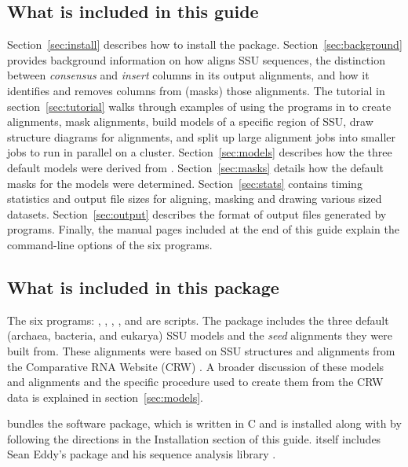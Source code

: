 \subsection{What is included in this guide}

Section~\ref{sec:install} describes how to install the
package. Section~\ref{sec:background} provides background information
on how  aligns SSU sequences, the distinction between
\emph{consensus} and \emph{insert} columns in its output alignments,
and how it identifies and removes columns from (masks) those
alignments.  The tutorial in section~\ref{sec:tutorial} walks through
examples of using the programs in  to create
alignments, mask alignments, build models of a specific region of SSU,
draw structure diagrams for alignments, and split up large alignment
jobs into smaller jobs to run in parallel on a cluster.
Section~\ref{sec:models} describes how the three default models were
derived from . Section~\ref{sec:masks} details how the
default masks for the models were determined. 
Section~\ref{sec:stats} contains timing statistics and output file
sizes for aligning, masking and drawing various sized datasets.
Section~\ref{sec:output} describes the
format of output files generated by  programs.
Finally, the manual pages included at the end
of this guide explain the command-line options of the six programs.

\subsection{What is included in this package}

The six  programs: , ,
, ,  and 
are  scripts.  The package includes the three default (archaea,
bacteria, and eukarya) SSU models and the \emph{seed} alignments they
were built from. These alignments were based on SSU structures and
alignments from the Comparative RNA Website (CRW)
\cite{CannoneGutell02}. A broader discussion of these models and
alignments and the specific procedure used to create them from the CRW
data is explained in section~\ref{sec:models}.

 bundles the  software package, which is
written in C and is installed along with  by following
the directions in the Installation section of this
guide.  itself includes Sean Eddy's  package
and his sequence analysis library .


